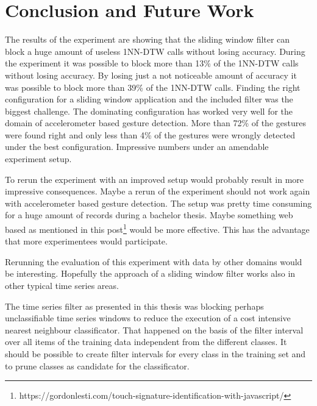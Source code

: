 \section{Conclusion and Future Work} \label{conclusion_and_future_work}
The results of the experiment are showing that the sliding window filter can block a huge amount of useless 1NN-DTW
calls without losing accuracy. During the experiment it was possible to block more than 13\% of the 1NN-DTW calls without losing accuracy. By
losing just a not noticeable amount of accuracy it was possible to block more than 39\% of the 1NN-DTW calls. Finding the
right configuration for a sliding window application and the included filter was the biggest challenge. The dominating
configuration has worked very well for the domain of accelerometer based gesture detection. More than 72\% of the
gestures were found right and only less than 4\% of the gestures were wrongly detected under the best
configuration. Impressive numbers under an amendable experiment setup.

To rerun the experiment with an improved setup would probably result in more impressive consequences. Maybe a rerun of the experiment should not work again
with accelerometer based gesture detection. The setup was pretty time consuming for a huge amount of records during a
bachelor thesis. Maybe something web based as mentioned in this
post\footnote{https://gordonlesti.com/touch-signature-identification-with-javascript/} would be more effective. This has the advantage that more
experimentees would participate.

Rerunning the evaluation of this experiment with data by other domains would be interesting. Hopefully the approach of a
sliding window filter works also in other typical time series areas.

The time series filter as presented in this thesis was blocking perhaps unclassifiable time series
windows to reduce the execution of a cost intensive nearest neighbour classificator. That happened on the basis of the
filter interval over all items of the training data independent from the different classes. It should be possible to
create filter intervals for every class in the training set and to prune classes as candidate for the classificator.

